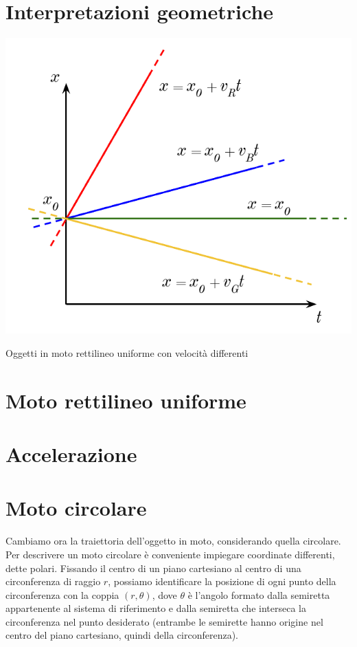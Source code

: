 \section{Interpretazioni geometriche}

\begin{marginfigure}
    \centering
    \includegraphics[width = \marginparwidth]{figures/velocita.pdf}
    \caption{Oggetti in moto rettilineo uniforme con velocità differenti}
\end{marginfigure}


\section{Moto rettilineo uniforme}


\section{Accelerazione}



\section{Moto circolare}
Cambiamo ora la traiettoria dell'oggetto in moto, considerando quella circolare.
Per descrivere un moto circolare è conveniente impiegare coordinate differenti,
dette polari. Fissando il centro di un piano cartesiano al centro di una
circonferenza di raggio $r$, possiamo identificare la posizione di ogni punto
della circonferenza con la coppia $(r, \theta)$, dove $\theta$ è l'angolo
formato dalla semiretta appartenente al sistema di riferimento e dalla semiretta
che interseca la circonferenza nel punto desiderato (entrambe le semirette
hanno origine nel centro del piano cartesiano, quindi della circonferenza).

